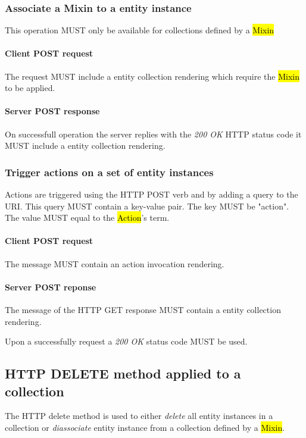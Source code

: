 \documentclass[10pt,a4paper]{article}
\begin{document}
\subsubsection{Associate a Mixin to a entity instance}
This operation MUST only be available for collections defined by a \hl{Mixin}

\paragraph{Client POST request}
The request MUST include a entity collection rendering which require the \hl{Mixin} to be applied.

\paragraph{Server POST response}
On successfull operation the server replies with the \emph{200 OK} HTTP status code it MUST include a entity collection rendering.

\subsubsection{Trigger actions on a set of entity instances}
Actions are triggered using the HTTP POST verb and by adding a query to the URI. This query MUST contain a key-value pair. The key MUST be "action". The value MUST equal to the \hl{Action}'s term.

\paragraph{Client POST request}
The message MUST contain an action invocation rendering.

\paragraph{Server POST reponse}
The message of the HTTP GET response MUST contain a entity collection rendering.

Upon a successfully request a \emph{200 OK} status code MUST be used.

\subsection{HTTP DELETE method applied to a collection}
The HTTP delete method is used to either {\em delete} all entity instances in a collection or {\em diassociate} entity instance from a collection defined by a \hl{Mixin}.
\end{document}
